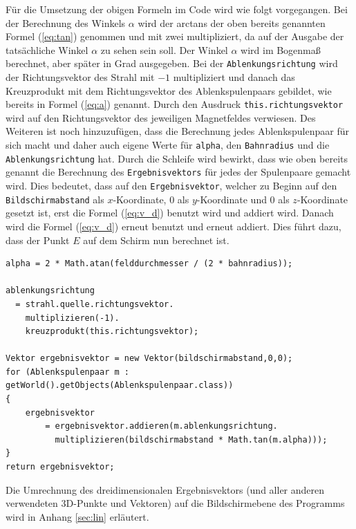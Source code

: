 Für die Umsetzung der obigen Formeln im Code wird wie folgt vorgegangen. 
Bei der Berechnung des Winkels $\alpha$ wird der arctans der oben bereits genannten Formel (\ref{eq:tan}) genommen und mit zwei multipliziert, da auf der Ausgabe der tatsächliche Winkel $\alpha$ zu sehen sein soll.
Der Winkel $\alpha$ wird im Bogenmaß berechnet, aber später in Grad ausgegeben.
Bei der \lstinline$Ablenkungsrichtung$ wird der Richtungsvektor des Strahl mit $-1$ multipliziert und danach das Kreuzprodukt mit dem Richtungsvektor des Ablenkspulenpaars gebildet, wie bereits in Formel (\ref{eq:a}) genannt.
Durch den Ausdruck \lstinline$this.richtungsvektor$ wird auf den Richtungsvektor des jeweiligen Magnetfeldes verwiesen.
Des Weiteren ist noch hinzuzufügen, dass die Berechnung jedes Ablenkspulenpaar für sich macht und daher auch eigene Werte für \lstinline$alpha$, den \lstinline$Bahnradius$ und die \lstinline$Ablenkungsrichtung$ hat.
Durch die Schleife wird bewirkt, dass wie oben bereits genannt die Berechnung des \lstinline$Ergebnisvektors$ für jedes der Spulenpaare gemacht wird.
Dies bedeutet, dass auf den \lstinline$Ergebnisvektor$, welcher zu Beginn auf den \lstinline$Bildschirmabstand$ als $x$-Koordinate, $0$ als $y$-Koordinate und 0 als $z$-Koordinate gesetzt ist, erst die Formel (\ref{eq:v_d}) benutzt wird und addiert wird.
Danach wird die Formel (\ref{eq:v_d}) erneut benutzt und erneut addiert. Dies führt dazu, dass der Punkt $E$ auf dem Schirm nun berechnet ist.

\begin{lstlisting}
alpha = 2 * Math.atan(felddurchmesser / (2 * bahnradius));

ablenkungsrichtung
  = strahl.quelle.richtungsvektor.
    multiplizieren(-1).
    kreuzprodukt(this.richtungsvektor);

Vektor ergebnisvektor = new Vektor(bildschirmabstand,0,0);
for (Ablenkspulenpaar m : getWorld().getObjects(Ablenkspulenpaar.class))
{
    ergebnisvektor
        = ergebnisvektor.addieren(m.ablenkungsrichtung.
          multiplizieren(bildschirmabstand * Math.tan(m.alpha)));
}
return ergebnisvektor;
\end{lstlisting}

Die Umrechnung des dreidimensionalen Ergebnisvektors (und aller anderen verwendeten 3D-Punkte und Vektoren) auf die Bildschirmebene des Programms wird in Anhang \ref{sec:lin} erläutert.
     
